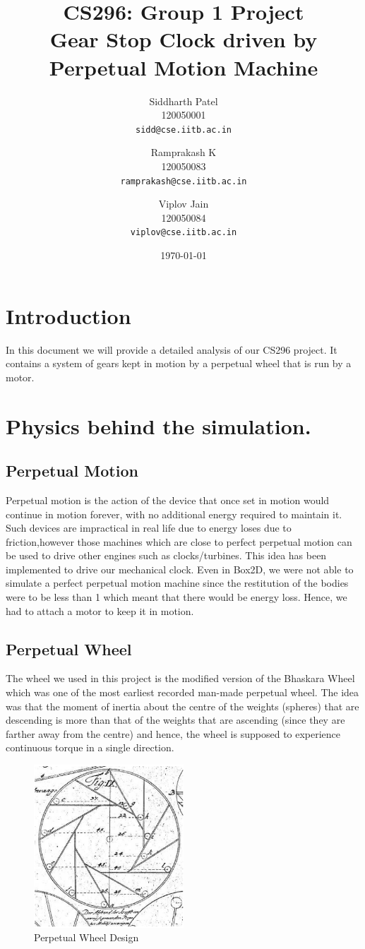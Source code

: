 \documentclass[10pt]{article} \usepackage[a4paper,left=0.8in,right=0.8in,top=0.4in,bottom=0.8in]{geometry} \usepackage{graphicx}
\title{\textbf{CS296: Group 1 Project}\\{Gear Stop Clock driven by Perpetual Motion Machine}}
\author{ Siddharth Patel\\ 
120050001\\ 
\texttt{sidd@cse.iitb.ac.in} 
\and Ramprakash K\\ 
120050083\\ 
\texttt{ramprakash@cse.iitb.ac.in} 
\and Viplov Jain\\ 
120050084\\ 
\texttt{viplov@cse.iitb.ac.in}\\ 
}
\date{\today}
\begin{document}
 
\maketitle 


\section{Introduction}In this document we will provide a detailed analysis of our CS296 project. It contains a system of gears kept in motion by a perpetual wheel that is run by a motor.
\section{Physics behind the simulation.}
\subsection{Perpetual Motion}
Perpetual motion is the action of the device that once set in motion would continue in motion forever, with no additional energy required to maintain it. Such devices are impractical in real life due to energy loses due to friction,however those machines which are close to perfect perpetual motion can be used to drive other engines such as clocks/turbines. This idea has been implemented to drive our mechanical clock. Even in Box2D, we were not able to simulate a perfect perpetual motion machine since the restitution of the bodies were to be less than 1 which meant that there would be energy loss. Hence, we had to attach a motor to keep it in motion.
\subsection{Perpetual Wheel}
The wheel we used in this project is the modified version of the Bhaskara Wheel which was one of the most earliest recorded man-made perpetual wheel. The idea was that the moment of inertia about the centre of the weights (spheres) that are descending is more than that of the weights that are ascending (since they are farther away from the centre) and hence, the wheel is supposed to experience continuous torque in a single direction.

\begin{figure}[ht!]
\centering
\includegraphics[width=0.5\textwidth]{images/pic.png}
\caption{Perpetual Wheel Design}
\end{figure}
\end{document}
